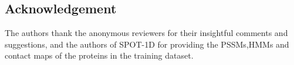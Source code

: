 \documentclass[11 pt, a4paper]{article}
\begin{document}
\begin{multicols}{2}
\section*{Acknowledgement}
The authors thank the anonymous reviewers for their
insightful comments and suggestions, and the authors of 
SPOT-1D for providing the PSSMs,HMMs and contact maps of the 
proteins in the training dataset.

\end{multicols}

\printbibliography
\end{document}
